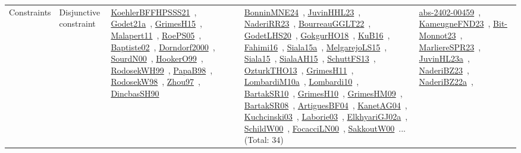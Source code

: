 {\begin{longtable}{lp{3cm}>{\raggedright\arraybackslash}p{6cm}>{\raggedright\arraybackslash}p{6cm}>{\raggedright\arraybackslash}p{8cm}}
Constraints & Disjunctive constraint & \href{../works/KoehlerBFFHPSSS21.pdf}{KoehlerBFFHPSSS21}~\cite{KoehlerBFFHPSSS21}, \href{../works/Godet21a.pdf}{Godet21a}~\cite{Godet21a}, \href{../works/GrimesH15.pdf}{GrimesH15}~\cite{GrimesH15}, \href{../works/Malapert11.pdf}{Malapert11}~\cite{Malapert11}, \href{../works/RoePS05.pdf}{RoePS05}~\cite{RoePS05}, \href{../works/Baptiste02.pdf}{Baptiste02}~\cite{Baptiste02}, \href{../works/Dorndorf2000.pdf}{Dorndorf2000}~\cite{Dorndorf2000}, \href{../works/SourdN00.pdf}{SourdN00}~\cite{SourdN00}, \href{../works/HookerO99.pdf}{HookerO99}~\cite{HookerO99}, \href{../works/RodosekWH99.pdf}{RodosekWH99}~\cite{RodosekWH99}, \href{../works/PapaB98.pdf}{PapaB98}~\cite{PapaB98}, \href{../works/RodosekW98.pdf}{RodosekW98}~\cite{RodosekW98}, \href{../works/Zhou97.pdf}{Zhou97}~\cite{Zhou97}, \href{../works/DincbasSH90.pdf}{DincbasSH90}~\cite{DincbasSH90} & \href{../works/BonninMNE24.pdf}{BonninMNE24}~\cite{BonninMNE24}, \href{../works/JuvinHHL23.pdf}{JuvinHHL23}~\cite{JuvinHHL23}, \href{../works/NaderiRR23.pdf}{NaderiRR23}~\cite{NaderiRR23}, \href{../works/BourreauGGLT22.pdf}{BourreauGGLT22}~\cite{BourreauGGLT22}, \href{../works/GodetLHS20.pdf}{GodetLHS20}~\cite{GodetLHS20}, \href{../works/GokgurHO18.pdf}{GokgurHO18}~\cite{GokgurHO18}, \href{../works/KuB16.pdf}{KuB16}~\cite{KuB16}, \href{../works/Fahimi16.pdf}{Fahimi16}~\cite{Fahimi16}, \href{../works/Siala15a.pdf}{Siala15a}~\cite{Siala15a}, \href{../works/MelgarejoLS15.pdf}{MelgarejoLS15}~\cite{MelgarejoLS15}, \href{../works/Siala15.pdf}{Siala15}~\cite{Siala15}, \href{../works/SialaAH15.pdf}{SialaAH15}~\cite{SialaAH15}, \href{../works/SchuttFS13.pdf}{SchuttFS13}~\cite{SchuttFS13}, \href{../works/OzturkTHO13.pdf}{OzturkTHO13}~\cite{OzturkTHO13}, \href{../works/GrimesH11.pdf}{GrimesH11}~\cite{GrimesH11}, \href{../works/LombardiM10a.pdf}{LombardiM10a}~\cite{LombardiM10a}, \href{../works/Lombardi10.pdf}{Lombardi10}~\cite{Lombardi10}, \href{../works/BartakSR10.pdf}{BartakSR10}~\cite{BartakSR10}, \href{../works/GrimesH10.pdf}{GrimesH10}~\cite{GrimesH10}, \href{../works/GrimesHM09.pdf}{GrimesHM09}~\cite{GrimesHM09}, \href{../works/BartakSR08.pdf}{BartakSR08}~\cite{BartakSR08}, \href{../works/ArtiguesBF04.pdf}{ArtiguesBF04}~\cite{ArtiguesBF04}, \href{../works/KanetAG04.pdf}{KanetAG04}~\cite{KanetAG04}, \href{../works/Kuchcinski03.pdf}{Kuchcinski03}~\cite{Kuchcinski03}, \href{../works/Laborie03.pdf}{Laborie03}~\cite{Laborie03}, \href{../works/ElkhyariGJ02a.pdf}{ElkhyariGJ02a}~\cite{ElkhyariGJ02a}, \href{../works/SchildW00.pdf}{SchildW00}~\cite{SchildW00}, \href{../works/FocacciLN00.pdf}{FocacciLN00}~\cite{FocacciLN00}, \href{../works/SakkoutW00.pdf}{SakkoutW00}~\cite{SakkoutW00}... (Total: 34) & \href{../works/abs-2402-00459.pdf}{abs-2402-00459}~\cite{abs-2402-00459}, \href{../works/KameugneFND23.pdf}{KameugneFND23}~\cite{KameugneFND23}, \href{../works/Bit-Monnot23.pdf}{Bit-Monnot23}~\cite{Bit-Monnot23}, \href{../works/MarliereSPR23.pdf}{MarliereSPR23}~\cite{MarliereSPR23}, \href{../works/JuvinHL23a.pdf}{JuvinHL23a}~\cite{JuvinHL23a}, \href{../works/NaderiBZ23.pdf}{NaderiBZ23}~\cite{NaderiBZ23}, \href{../works/NaderiBZ22a.pdf}{NaderiBZ22a}~\cite{NaderiBZ22a}, 
\end{longtable}}
